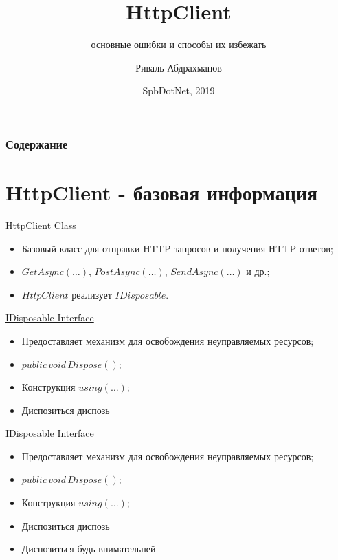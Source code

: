 \documentclass[17pt,aspectratio=169]{beamer}
\title{HttpClient}
\subtitle{основные ошибки и способы их избежать}
\author{Риваль Абдрахманов}
\institute[PT]{Positive Technologies}
\date{SpbDotNet, 2019}
\begin{document}
\begin{frame}
\titlepage
\end{frame}

\begin{frame}
\frametitle{Содержание}
\tableofcontents
\end{frame}

\section{HttpClient - базовая информация}

\begin{frame}{\href{https://docs.microsoft.com/en-us/dotnet/api/system.net.http.httpclient?view=netcore-2.2}{HttpClient Class}}
    \begin{itemize}
        \item <1-> Базовый класс для отправки HTTP-запросов и получения HTTP-ответов;
        \item <2-> $GetAsync(\ldots)$, $PostAsync(\ldots)$, $SendAsync(\ldots)$ и др.;
        \item <3-> $HttpClient$ реализует $IDisposable$.
    \end{itemize}
\end{frame}

\begin{frame}{\href{https://docs.microsoft.com/en-us/dotnet/api/system.idisposable?view=netcore-2.2}{IDisposable Interface}}
    \begin{itemize}
        \item <1-> Предоставляет механизм для освобождения неуправляемых ресурсов;
        \item <2-> $public\,void\,Dispose()$;
        \item <3-> Конструкция $using(\ldots)$;
        \item <4-> Диспозиться\,\textrightarrow \,диспозь
    \end{itemize}
\end{frame}

\begin{frame}{\href{https://docs.microsoft.com/en-us/dotnet/api/system.idisposable?view=netcore-2.2}{IDisposable Interface}}
    \begin{itemize}
        \item Предоставляет механизм для освобождения неуправляемых ресурсов;
        \item $public\,void\,Dispose()$;
        \item Конструкция $using(\ldots)$;
        \item \sout{Диспозиться\,\textrightarrow \,диспозь}
        \item Диспозиться\,\textrightarrow \,будь внимательней
    \end{itemize}
\end{frame}
\end{document}
